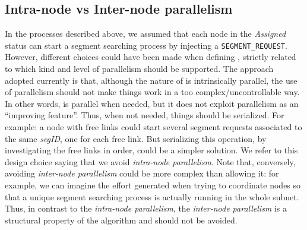 \subsection{Intra-node vs Inter-node parallelism}
In the processes described above, we assumed that each node in the
\emph{Assigned} status can start a segment searching process by
injecting a \texttt{SEGMENT\_REQUEST}. However, different choices
could have been made when defining \disr{}, strictly related to which
kind and level of parallelism should be supported. The approach adopted
currently is that, although the nature of \disr{} is intrinsically
parallel, the use of parallelism should not make things work in a too
complex/uncontrollable way. In other words, \disr{} is parallel when
needed, but it does not exploit parallelism as an ``improving
feature''. Thus, when not needed, things should be serialized. For
example: a node with free links could start several segment requests
associated to the same \emph{segID}, one for each free link. But
serializing this operation, by investigating the free links in order,
could be a simpler solution. We refer to this \disr{} design choice
saying that we avoid \emph{intra-node parallelism}.  Note that,
conversely, avoiding \emph{inter-node parallelism} could be more
complex than allowing it: for example, we can imagine the effort
generated when trying to coordinate nodes so that a unique segment
searching process is actually running in the whole subnet. Thus, in
contrast to the \emph{intra-node parallelism}, the \emph{inter-node
parallelism} is a structural property of the \disr{} algorithm and
should not be avoided.
